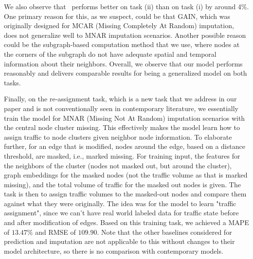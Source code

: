 We also observe that \name\ performs better on task (ii) than on task (i) by around 4\%. One primary reason for this, as we suspect, could be that GAIN, which was originally designed for MCAR (Missing Completely At Random) imputation, does not generalize well to MNAR imputation scenarios. Another possible reason could be the subgraph-based computation method that we use, where nodes at the corners of the subgraph do not have adequate spatial and temporal information about their neighbors. Overall, we observe that our model performs reasonably and delivers comparable results for being a generalized model on both tasks.

Finally, on the re-assignment task, which is a new task that we address in our paper and is not conventionally seen in contemporary literature, we essentially train the model for MNAR (Missing Not At Random) imputation scenarios with the central node cluster missing. This effectively makes the model learn how to assign traffic to node clusters given neighbor node information. To elaborate further, for an edge that is modified, nodes around the edge, based on a distance threshold, are masked, i.e., marked missing. For training input, the features for the neighbors of the cluster (nodes not masked out, but around the cluster), graph embeddings for the masked nodes (not the traffic volume as that is marked missing), and the total volume of traffic for the masked out nodes is given. The task is then to assign traffic volumes to the masked-out nodes and compare them against what they were originally. The idea was for the model to learn "traffic assignment", since we can't have real world labeled data for traffic state before and after modification of edges. Based on this training task, we achieved a MAPE of $13.47\%$ and RMSE of $109.90$. Note that the other baselines considered for prediction and imputation are not applicable to this without changes to their model architecture, so there is no comparison with contemporary models.


